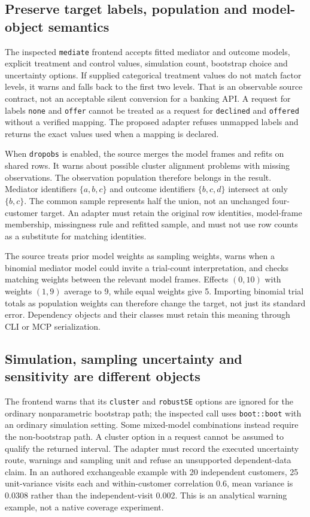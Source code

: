 \subsection{Preserve target labels, population and model-object semantics}
The inspected \texttt{mediate} frontend accepts fitted mediator and outcome
models, explicit treatment and control values, simulation count, bootstrap
choice and uncertainty options. If supplied categorical treatment values do
not match factor levels, it warns and falls back to the first two levels.
That is an observable source contract, not an acceptable silent conversion
for a banking API. A request for labels \texttt{none} and \texttt{offer}
cannot be treated as a request for \texttt{declined} and \texttt{offered}
without a verified mapping. The proposed adapter refuses unmapped labels and
returns the exact values used when a mapping is declared.
\citep{exec24_mediation_sources,exec24_mediation_contract}

When \texttt{dropobs} is enabled, the source merges the model frames and refits
on shared rows. It warns about possible cluster alignment problems with
missing observations. The observation population therefore belongs in the
result. Mediator identifiers $\{a,b,c\}$ and outcome identifiers
$\{b,c,d\}$ intersect at only $\{b,c\}$. The common sample represents half
the union, not an unchanged four-customer target. An adapter must retain the
original row identities, model-frame membership, missingness rule and refitted
sample, and must not use row counts as a substitute for matching identities.
\citep{exec24_mediation_sources,exec24_mediation_contract}

The source treats prior model weights as sampling weights, warns when a
binomial mediator model could invite a trial-count interpretation, and checks
matching weights between the relevant model frames. Effects $(0,10)$ with
weights $(1,9)$ average to 9, while equal weights give 5. Importing binomial
trial totals as population weights can therefore change the target, not just
its standard error. Dependency objects and their classes must retain this
meaning through CLI or MCP serialization.
\citep{exec24_mediation_sources,exec24_mediation_contract}

\subsection{Simulation, sampling uncertainty and sensitivity are different objects}
The frontend warns that its \texttt{cluster} and \texttt{robustSE} options are
ignored for the ordinary nonparametric bootstrap path; the inspected call uses
\texttt{boot::boot} with an ordinary simulation setting. Some mixed-model
combinations instead require the non-bootstrap path. A cluster option in a
request cannot be assumed to qualify the returned interval. The adapter must
record the executed uncertainty route, warnings and sampling unit and refuse
an unsupported dependent-data claim. In an authored exchangeable example with
20 independent customers, 25 unit-variance visits each and within-customer
correlation 0.6, mean variance is 0.0308 rather than the independent-visit
0.002. This is an analytical warning example, not a native coverage experiment.
\citep{exec24_mediation_sources,exec24_mediation_contract}

